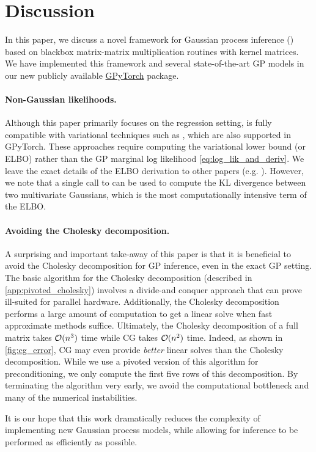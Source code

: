 \section{Discussion}
In this paper, we discuss a novel framework for Gaussian process inference (\mmacro{}) based on blackbox matrix-matrix multiplication routines with kernel matrices.
We have implemented this framework and several state-of-the-art GP models in our new publicly available {\href{https://gpytorch.ai}{GPyTorch}} package.

\paragraph{Non-Gaussian likelihoods.}
Although this paper primarily focuses on the regression setting, \mmacro{} is fully compatible with variational techniques such as \cite{hensman2015scalable,wilson2016stochastic}, which are also supported in GPyTorch.
These approaches require computing the variational lower bound (or ELBO) rather than the GP marginal log likelihood \eqref{eq:log_lik_and_deriv}. We leave the exact details of the ELBO derivation to other papers (e.g. \cite{hensman2015scalable}).
However, we note that a single call to \mcgacro{} can be used to compute the KL divergence between two multivariate Gaussians, which is the most computationally intensive term of the ELBO.

\paragraph{Avoiding the Cholesky decomposition.}
A surprising and important take-away of this paper is that it is beneficial to avoid the Cholesky decomposition for GP inference, even in the exact GP setting.
The basic algorithm for the Cholesky decomposition (described in \autoref{app:pivoted_cholesky}) involves a divide-and conquer approach that can prove ill-suited for parallel hardware.
Additionally, the Cholesky decomposition performs a large amount of computation to get a linear solve when fast approximate methods suffice.
Ultimately, the Cholesky decomposition of a full matrix takes $\bigo{n^3}$ time while CG takes $\bigo{n^2}$ time.
Indeed, as shown in \autoref{fig:cg_error}, CG may even provide \emph{better} linear solves than the Cholesky decomposition.
While we use a pivoted version of this algorithm for preconditioning, we only compute the first five rows of this decomposition.
By terminating the algorithm very early, we avoid the computational bottleneck and many of the numerical instabilities.

It is our hope that this work dramatically reduces the complexity of implementing new Gaussian process models,
while allowing for inference to be performed as efficiently as possible.
